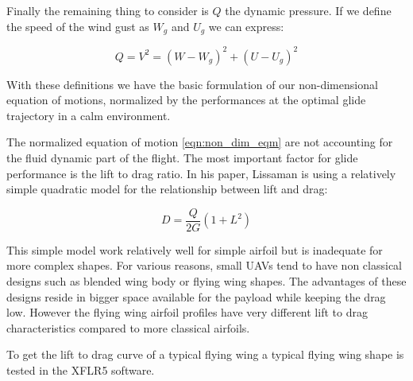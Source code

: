 \par Finally the remaining thing to consider is $Q$ the dynamic pressure. If we define the speed of the wind gust as $W_g$ and $U_g$ we can express:

\begin{equation}
	Q = V^2 = (W-W_g)^2 + (U-U_g)^2
	\label{eqn:q_def}
\end{equation}

\par With these definitions we have the basic formulation of our non-dimensional equation of motions, normalized by the performances at the optimal glide trajectory in a calm environment.

The normalized equation of motion \ref{eqn:non_dim_eqm} are not accounting for the fluid dynamic part of the flight.
The most important factor for glide performance is the lift to drag ratio. 
In his paper, Lissaman \cite{Lissaman2007neutral} is using a relatively simple quadratic model for the relationship between lift and drag:

\begin{equation}
	D=\frac{Q}{2G}(1+L^2)
	\label{eqn:Lissaman_G}
\end{equation}


\par This simple model work relatively well for simple airfoil but is inadequate for more complex shapes.
For various reasons, small UAVs tend to have non classical designs such as blended wing body or flying wing shapes.
The advantages of these designs reside in bigger space available for the payload while keeping the drag low.
However the flying wing airfoil profiles have very different lift to drag characteristics compared to more classical airfoils.

\par To get the lift to drag curve of a typical flying wing a typical flying wing shape is tested in the XFLR5 software.

